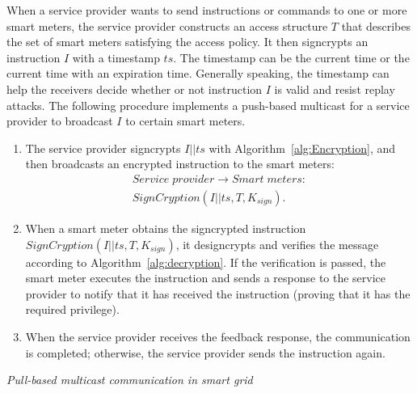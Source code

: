 \documentclass[letterpaper,12pt]{article}
\begin{document}
When a service provider wants to send instructions or commands to one or more smart meters, the service provider constructs an access structure $T$ that describes the set of smart meters satisfying the access policy. It then signcrypts an instruction $I$ with a timestamp $ts$. The timestamp can be the current time or the current time with an expiration time. Generally speaking, the timestamp can help the receivers decide whether or not instruction $I$ is valid and resist replay attacks.   The following procedure implements a push-based multicast for a service provider to broadcast $I$ to certain smart meters.
%
\begin{enumerate}
\item The service provider signcrypts $I||ts$ with Algorithm~\ref{alg:Encryption}, and then broadcasts an encrypted instruction to the smart meters:
\begin{equation}
\begin{split}
Service\;  provider\rightarrow Smart\; meters:\\
 SignCryption(I||ts, T, K_{sign}).\nonumber
\end{split}
\end{equation}

\item When a smart meter obtains the signcrypted instruction $SignCryption(I||ts, T, K_{sign})$, it designcrypts and verifies the message according to Algorithm~\ref{alg:decryption}. If the verification is passed, the smart meter executes the instruction and sends a response to the service provider to notify that it has received the instruction (proving that it has the required privilege).

\item  When the service provider receives the feedback response, the communication is completed; otherwise, the service provider sends the instruction again.
\end{enumerate}

\emph{Pull-based multicast communication in smart grid} \label{sec:sec:data communication}
\end{document}
